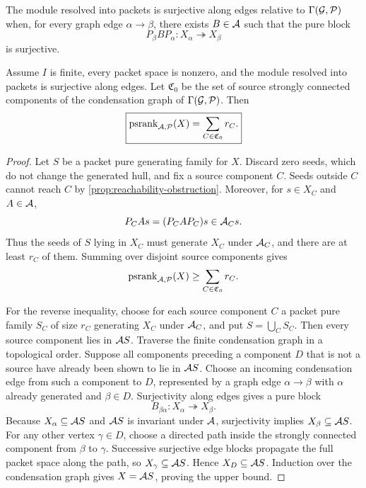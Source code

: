 \begin{definition}
\label{def:edge-surjective}
The module resolved into packets is surjective along edges relative to $\Gamma(\mathcal G,\mathcal P)$ when, for every graph edge $\alpha\to\beta$, there exists $B\in\mathcal A$ such that the pure block
\[
P_\beta BP_\alpha:X_\alpha\twoheadrightarrow X_\beta
\]
is surjective.
\end{definition}

\begin{theorem}
\label{thm:source-component-rank}
Assume $I$ is finite, every packet space is nonzero, and the module resolved into packets is surjective along edges.  Let $\mathfrak C_0$ be the set of source strongly connected components of the condensation graph of $\Gamma(\mathcal G,\mathcal P)$.  Then
\[
\boxed{
\operatorname{psrank}_{\mathcal A,\mathcal P}(X)
=
\sum_{C\in\mathfrak C_0}r_C.
}
\]
\end{theorem}

\begin{proof}
Let $S$ be a packet pure generating family for $X$.  Discard zero seeds, which do not change the generated hull, and fix a source component $C$.  Seeds outside $C$ cannot reach $C$ by \cref{prop:reachability-obstruction}.  Moreover, for $s\in X_C$ and $A\in\mathcal A$,
\[
P_CAs=(P_CAP_C)s\in\mathcal A_Cs.
\]
Thus the seeds of $S$ lying in $X_C$ must generate $X_C$ under $\mathcal A_C$, and there are at least $r_C$ of them.  Summing over disjoint source components gives
\[
\operatorname{psrank}_{\mathcal A,\mathcal P}(X)
\geq
\sum_{C\in\mathfrak C_0}r_C.
\]

For the reverse inequality, choose for each source component $C$ a packet pure family $S_C$ of size $r_C$ generating $X_C$ under $\mathcal A_C$, and put $S=\bigcup_CS_C$.  Then every source component lies in $\mathcal A S$.  Traverse the finite condensation graph in a topological order.  Suppose all components preceding a component $D$ that is not a source have already been shown to lie in $\mathcal A S$.  Choose an incoming condensation edge from such a component to $D$, represented by a graph edge $\alpha\to\beta$ with $\alpha$ already generated and $\beta\in D$.  Surjectivity along edges gives a pure block
\[
B_{\beta\alpha}:X_\alpha\twoheadrightarrow X_\beta.
\]
Because $X_\alpha\subseteq\mathcal A S$ and $\mathcal A S$ is invariant under $\mathcal A$, surjectivity implies $X_\beta\subseteq\mathcal A S$.  For any other vertex $\gamma\in D$, choose a directed path inside the strongly connected component from $\beta$ to $\gamma$.  Successive surjective edge blocks propagate the full packet space along the path, so $X_\gamma\subseteq\mathcal A S$.  Hence $X_D\subseteq\mathcal A S$.  Induction over the condensation graph gives $X=\mathcal A S$, proving the upper bound.
\end{proof}

